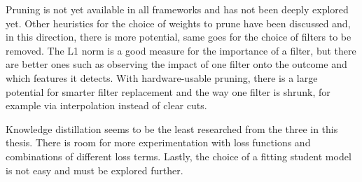 Pruning is not yet available in all frameworks and has not been deeply explored yet. Other heuristics for the choice of weights to prune have been discussed and, in this direction, there is more potential, same goes for the choice of filters to be removed. The L1 norm is a good measure for the importance of a filter, but there are better ones such as observing the impact of one filter onto the outcome and which features it detects. With hardware-usable pruning, there is a large potential for smarter filter replacement and the way one filter is shrunk, for example via interpolation instead of clear cuts.

Knowledge distillation seems to be the least researched from the three in this thesis. There is room for more experimentation with loss functions and combinations of different loss terms. Lastly, the choice of a fitting student model is not easy and must be explored further.

